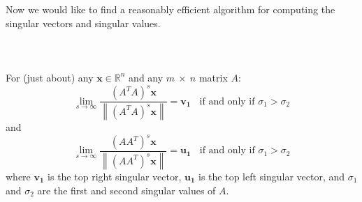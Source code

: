 \documentclass{tufte-handout}
\newcommand{\norm}[1]{\left\lVert#1\right\rVert}
\begin{document}
\noindent Now we would like to find a reasonably efficient algorithm for computing the singular vectors and singular values.\\\leavevmode\\

\\\leavevmode\\
\noindent For (just about) any $\mathbf{x}\in\mathbb{R}^n$ and any $m~\times~n$ matrix $A$:
\[
\lim_{s\rightarrow\infty}\frac{(A^TA)^s\mathbf{x}}{\norm{(A^TA)^s\mathbf{x}}}
=\mathbf{v_1}~~~~\text{if and only if }\sigma_{1}>\sigma_{2}
\]
and
\[
\lim_{s\rightarrow\infty}\frac{(AA^T)^s\mathbf{x}}{\norm{(AA^T)^s\mathbf{x}}}
=\mathbf{u_1}~~~~\text{if and only if }\sigma_{1}>\sigma_{2}
\]
where $\mathbf{v_1}$ is the top right singular vector, $\mathbf{u_1}$ is the top left singular vector, and $\sigma_{1}$ and $\sigma_{2}$ are the first and second singular values of $A$.\\\leavevmode\\
\\\leavevmode\\
\end{document}
